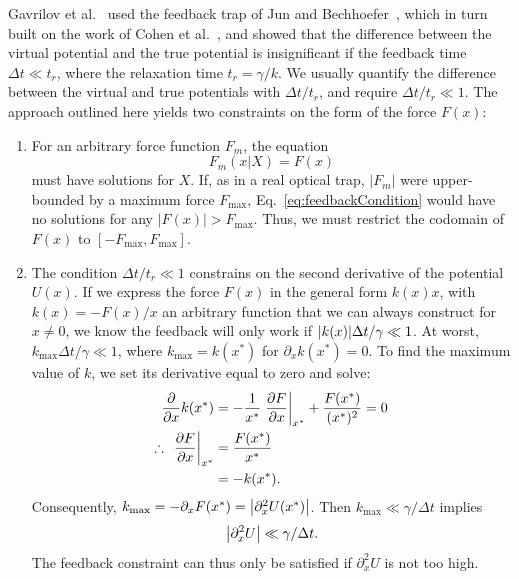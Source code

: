 \documentclass[hyperref={colorlinks=true, urlcolor=blue, citecolor=blue, final, bound}]{sfuthesis}
\begin{document}
Gavrilov et al.~\cite{Gavrilov2014} used the feedback trap of Jun and Bechhoefer~\cite{Jun2012}, which in turn built on the work of Cohen et al.~\cite{Cohen2005}, and showed that the difference between the virtual potential and the true potential is insignificant if the feedback time $\Delta t \ll t_r$, where the relaxation time $t_r=\gamma/k$. We usually quantify the difference between the virtual and true potentials with $\Delta t/t_r$, and require $\Delta t/t_r\ll 1$. The approach outlined here yields two constraints on the form of the force $F(x)$:
\begin{enumerate}
    \item For an arbitrary force function $F_m$, the equation \begin{equation}
        F_m(x|X)=F(x)\label{eq:feedbackCondition}
    \end{equation} 
    must have solutions for $X$. If, as in a real optical trap, $|F_m|$ were upper-bounded by a maximum force $F_{\max}$, Eq.~\ref{eq:feedbackCondition} would have no solutions for any $|F(x)|>F_{\max}$. Thus, we must restrict the codomain of $F(x)$ to $[-F_{\max}, F_{\max}]$. 
    \item The condition $\Delta t/t_r\ll 1$ constrains on the second derivative of the potential $U(x)$. If we express the force $F(x)$ in the general form $k(x)x$, with $k(x)=-F(x)/x$ an arbitrary function that we can always construct for $x\neq 0$, we know the feedback will only work if $\abs{k(x)}\Delta t/\gamma \ll 1$. At worst, $k_{\max}\Delta t/\gamma \ll 1$, where $k_{\max} = k(x^*)$ for $\partial_x k(x^*)=0$. To find the maximum value of $k$, we set its derivative equal to zero and solve:
    \begin{align}
        \pdv{x} k(x^*) &= -\frac{1}{x^*}\eval{\pdv{F}{x}}_{x^*} + \frac{F(x^*)}{(x^*)^2} =0\\
        \therefore\ \eval{\pdv{F}{x} }_{x^*} &= \frac{F(x^*)}{x^*}\\
        &=-k(x^*).
    \end{align}
    Consequently, $k_{\max} = -\partial_x F(x^*) = \abs{\partial_x^2 U(x^*)}$. Then $k_{\max}\ll \gamma/\Delta t$ implies
    \begin{equation}
        \abs{\partial_x^2 U} \ll \gamma/\Delta t.
    \end{equation}
    The feedback constraint can thus only be satisfied if $\partial_x^2 U$ is not too high.
\end{enumerate}
\end{document}
